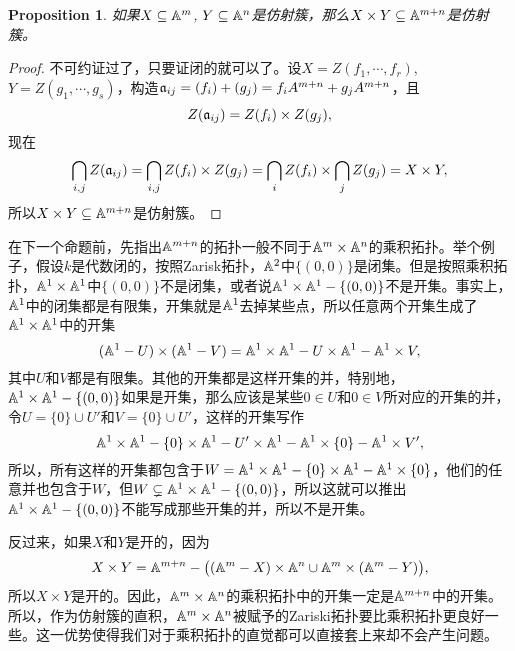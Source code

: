 \documentclass[9pt]{extarticle}
\theoremstyle{plain}%
\newtheorem{pro}[defi]{Proposition}%
\begin{document}
\begin{pro}
	如果$X\subseteq \mathbb{A}^{m}$, $Y\subseteq \mathbb{A}^{n}$是仿射簇，那么$X\times Y\subseteq \mathbb{A}^{m+n}$是仿射簇。
\end{pro}
\begin{proof}
	不可约证过了，只要证闭的就可以了。设$X=Z(f_{1},\cdots,f_{r})$, $Y=Z(g_{1},\cdots,g_{s})$，构造$\mathfrak{a}_{ij}=(f_i)+(g_j)=f_iA^{m+n}+g_jA^{m+n}$，且
	\[
		Z(\mathfrak{a}_{ij})=Z(f_i)\times Z(g_j),
	\]
	现在
	\[
		\bigcap_{i,j}Z(\mathfrak{a}_{ij})=\bigcap_{i,j}Z(f_i)\times Z(g_j)=\bigcap_i Z(f_i)\times \bigcap_j Z(g_j)=X\times Y,
	\]
	所以$X\times Y\subseteq \mathbb{A}^{m+n}$是仿射簇。
\end{proof}
在下一个命题前，先指出$\mathbb{A}^{m+n}$的拓扑一般不同于$\mathbb{A}^{m}\times \mathbb{A}^n$的乘积拓扑。举个例子，假设$k$是代数闭的，按照Zarisk拓扑，$\mathbb{A}^{2}$中$\{(0,0)\}$是闭集。但是按照乘积拓扑，$\mathbb{A}^1\times \mathbb{A}^1$中$\{(0,0)\}$不是闭集，或者说$\mathbb{A}^1\times \mathbb{A}^1-\{(0,0)\}$不是开集。事实上，$\mathbb{A}^1$中的闭集都是有限集，开集就是$\mathbb{A}^1$去掉某些点，所以任意两个开集生成了$\mathbb{A}^1\times \mathbb{A}^1$中的开集
\[
	(\mathbb{A}^1-U)\times (\mathbb{A}^1-V)=\mathbb{A}^1\times\mathbb{A}^1-U\times\mathbb{A}^1-\mathbb{A}^1\times V,
\]
其中$U$和$V$都是有限集。其他的开集都是这样开集的并，特别地，$\mathbb{A}^1\times \mathbb{A}^1-\{(0,0)\}$如果是开集，那么应该是某些$0\in U$和$0\in V$所对应的开集的并，令$U=\{0\}\cup U'$和$V=\{0\}\cup U'$，这样的开集写作
\[
	\mathbb{A}^1\times\mathbb{A}^1-\{0\}\times\mathbb{A}^1-U'\times\mathbb{A}^1-\mathbb{A}^1\times \{0\}-\mathbb{A}^1\times V',
\]
所以，所有这样的开集都包含于$W=\mathbb{A}^1\times\mathbb{A}^1-\{0\}\times\mathbb{A}^1-\mathbb{A}^1\times \{0\}$，他们的任意并也包含于$W$，但$W\subsetneq\mathbb{A}^1\times\mathbb{A}^1-\{(0,0)\}$，所以这就可以推出$\mathbb{A}^1\times\mathbb{A}^1-\{(0,0)\}$不能写成那些开集的并，所以不是开集。

反过来，如果$X$和$Y$是开的，因为
\[
	X\times Y=\mathbb{A}^{m+n}-\bigl((\mathbb{A}^{m}-X)\times \mathbb{A}^n\cup\mathbb{A}^{m}\times (\mathbb{A}^{m}-Y)\bigr),
\]
所以$X\times Y$是开的。因此，$\mathbb{A}^{m}\times \mathbb{A}^n$的乘积拓扑中的开集一定是$\mathbb{A}^{m+n}$中的开集。所以，作为仿射簇的直积，$\mathbb{A}^{m}\times \mathbb{A}^n$被赋予的Zariski拓扑要比乘积拓扑更良好一些。这一优势使得我们对于乘积拓扑的直觉都可以直接套上来却不会产生问题。
\end{document}
